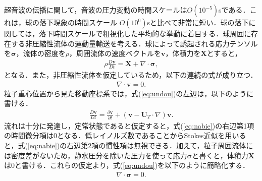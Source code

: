 超音波の伝播に関して，音波の圧力変動の時間スケールは$O\left(10^{-5}\right)$sである．これは，球の落下現象の時間スケール $O\left(10^{0}\right)$sと比べて非常に短い．球の落下に関しては，落下時間スケールで粗視化した平均的な挙動に着目する．球周囲に存在する非圧縮性流体の運動量輸送を考える．球によって誘起される応力テンソルを$\bm{\sigma}$，流体の密度を$\rho$，周囲流体の速度ベクトルを$\bm{v}$，体積力を$\bm{X}$とすると，
\begin{eqnarray}
    \rho \frac{D\bm{v}}{Dt} = \bm{X} + \nabla \cdot \bm{\sigma} ,
    \label{eq:undou}
\end{eqnarray}
となる．また，非圧縮性流体を仮定しているため，以下の連続の式が成り立つ．
\begin{eqnarray}
    \nabla \cdot \bm{v} = 0 .
    \label{eq:renzoku}
\end{eqnarray}
粒子重心位置から見た移動座標系では，式(\ref{eq:undou})の左辺は，以下のように書ける．
\begin{eqnarray}
    \frac{D\bm{v}}{Dt} = \frac{\partial \bm{v}}{\partial t} + \left(\bm{v} - \bm{U}_T \cdot \nabla \right) \bm{v} .
    \label{eq:nabie}
\end{eqnarray}
流れは十分に発達し，定常状態であると仮定すると，式(\ref{eq:nabie})の右辺第1項の時間微分項は0となる．低レイノルズ数であることからStokes近似を用いると，式(\ref{eq:nabie})の右辺第2項の慣性項は無視できる．加えて，粒子周囲流体には密度差がないため，静水圧分を除いた圧力を使って応力${\bm \sigma}$と書くと，体積力${\bm X}$は0と書ける．これらの仮定より，式(\ref{eq:undou})を以下のように簡略化する．
\begin{eqnarray}
    \nabla \cdot \bm{\sigma} = 0 .
    \label{eq:sigma-}
\end{eqnarray}

